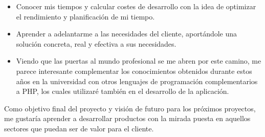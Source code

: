 \begin{itemize}
	\item Conocer mis tiempos y calcular costes de desarrollo con la idea de optimizar el rendimiento y planificación de mi tiempo.
	
	\item Aprender a adelantarme a las necesidades del cliente, aportándole una solución concreta, real y efectiva a sus necesidades.
	
	\item Viendo que las puertas al mundo profesional se me abren por este camino, me parece interesante complementar los conocimientos obtenidos durante estos años en la universidad con otros lenguajes de programación complementarios a PHP, los cuales utilizaré también en el desarrollo de la aplicación.
\end{itemize}

Como objetivo final del proyecto y visión de futuro para los próximos proyectos, me gustaría aprender a desarrollar productos con la mirada puesta en aquellos sectores que puedan ser de valor para el cliente.
